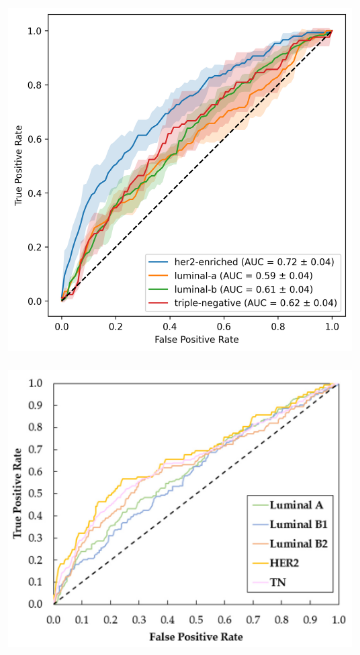 \documentclass[a4paper,10pt]{book}
\begin{document}
\begin{figure}[h!]
    \centering
    \begin{subfigure}[t]{0.32\textwidth}
        \centering
        \includegraphics[width=\textwidth]{reports/assets/MEAN_AUC_Vit.png}
        \caption{}
        \label{fig:mean_auc_vit_final}
    \end{subfigure}
    \begin{subfigure}[t]{0.32\textwidth}
        \centering
        \includegraphics[width=\textwidth]{reports/assets/MotaMulticlass.png}

\end{subfigure}
\end{figure}
\end{document}
